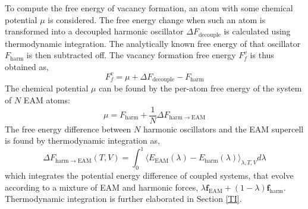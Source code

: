 \documentclass{article}
\begin{document}
To compute the free energy of vacancy formation, an atom with some chemical potential $\mu$ is considered. The free energy change when such an atom is transformed into a decoupled harmonic oscillator $\Delta F_\mathrm{decouple}$ is calculated using thermodynamic integration. The analytically known free energy of that oscillator $F_\mathrm{harm}$ is then subtracted off. The vacancy formation free energy $F_f^v$ is thus obtained as,
%
\begin{equation} \label{eq:43}
F_f^v = \mu + \Delta F_\mathrm{decouple} - F_\mathrm{harm}
\end{equation}
%
The chemical potential $\mu$ can be found by the per-atom free energy of the system of $N$ EAM atoms:
%
\begin{equation} \label{eq:44}
\mu = F_\mathrm{harm} + \frac{1}{N}\Delta F_\mathrm{harm \rightarrow EAM}
\end{equation}
%
The free energy difference between $N$ harmonic oscillators and the EAM supercell is found by thermodynamic integration as,
%
\begin{equation} \label{eq:45}
\Delta F_\mathrm{harm \rightarrow EAM}(T, V) = \int_0^1 \langle E_\mathrm{EAM}(\lambda) - E_\mathrm{harm}(\lambda) \rangle_{\lambda, T, V} d\lambda
\end{equation}
%
which integrates the potential energy difference of coupled systems, that evolve according to a mixture of EAM and harmonic forces, $\lambda \bm{f}_\mathrm{EAM} + (1 - \lambda) \bm{f}_\mathrm{harm}$. Thermodynamic integration is further elaborated in Section \ref{TI}.
\end{document}
